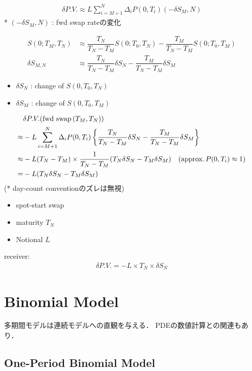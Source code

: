 \documentclass[a4paper,11pt]{jsarticle}
\theoremstyle{definition}
\newcommand{\df}[2]{\dfrac{#1}{#2}}
\begin{document}
\begin{align}
  \delta P.V. \approx L\sum_{i=M+1}^N\Delta_i P(0,T_i)
  (-\delta S_M,N)
\end{align}
* $(-\delta S_M,N)$ : fwd swap rateの変化


\begin{align}
  S(0;T_M,T_N)&\approx\df{T_N}{T_N-T_M}S(0;T_0,T_N)
  -\df{T_M}{T_N-T_M}S(0;T_0,T_M) \\
  \delta S_{M,N}&\approx\df{T_N}{T_N-T_M}\delta S_N
  -\df{T_M}{T_N-T_M}\delta S_M
\end{align}

\begin{itemize}
  \item $\delta S_N$ : change of $S(0,T_0,T_N)$
  \item $\delta S_M$ : change of $S(0,T_0,T_M)$ 
\end{itemize}

\begin{align}
  &\delta P.V. (\mbox{fwd swap} \, (T_M,T_N)) \notag\\
  \approx& -L\sum_{i=M+1}^N\Delta_i P(0,T_i)
  \left\{\df{T_N}{T_N-T_M}\delta S_N
  -\df{T_M}{T_N-T_M}\delta S_M \right\} \notag \\
  \approx&-L(T_N-T_M)\times \df{1}{T_N-T_M}
  (T_N\delta S_N-T_M\delta S_M) \quad
  (\mbox{approx.}\, P(0,T_i)\approx 1 ) \notag \\
  =&-L(T_N\delta S_N-T_M \delta S_M)
\end{align}
(* day-count conventionのズレは無視)

\begin{itemize}
  \item spot-start swap
  \item maturity $T_N$
  \item Notional $L$
\end{itemize}
receiver:
\begin{align}
  \delta P.V.=-L\times T_N\times\delta S_N
\end{align}


\newpage
\section{Binomial Model}
多期間モデルは連続モデルへの直観を与える．
PDEの数値計算との関連もあり．

\subsection{One-Period Binomial Model}
\end{document}
